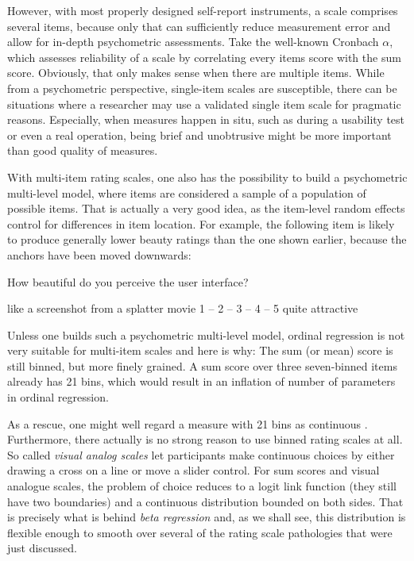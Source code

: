 \documentclass[]{svmono}
\begin{document}
However, with most properly designed self-report instruments, a scale
comprises several items, because only that can sufficiently reduce
measurement error and allow for in-depth psychometric assessments. Take
the well-known Cronbach \(\alpha\), which assesses reliability of a
scale by correlating every items score with the sum score. Obviously,
that only makes sense when there are multiple items. While from a
psychometric perspective, single-item scales are susceptible, there can
be situations where a researcher may use a validated single item scale
for pragmatic reasons. Especially, when measures happen in situ, such as
during a usability test or even a real operation, being brief and
unobtrusive might be more important than good quality of measures.

With multi-item rating scales, one also has the possibility to build a
psychometric multi-level model, where items are considered a sample of a
population of possible items. That is actually a very good idea, as the
item-level random effects control for differences in item location. For
example, the following item is likely to produce generally lower beauty
ratings than the one shown earlier, because the anchors have been moved
downwards:

How beautiful do you perceive the user interface?

like a screenshot from a splatter movie 1 -- 2 -- 3 -- 4 -- 5 quite
attractive

Unless one builds such a psychometric multi-level model, ordinal
regression is not very suitable for multi-item scales and here is why:
The sum (or mean) score is still binned, but more finely grained. A sum
score over three seven-binned items already has 21 bins, which would
result in an inflation of number of parameters in ordinal regression.

As a rescue, one might well regard a measure with 21 bins as continuous
. Furthermore, there actually is no strong reason to use binned rating
scales at all. So called \emph{visual analog scales} let participants
make continuous choices by either drawing a cross on a line or move a
slider control. For sum scores and visual analogue scales, the problem
of choice reduces to a logit link function (they still have two
boundaries) and a continuous distribution bounded on both sides. That is
precisely what is behind \emph{beta regression} and, as we shall see,
this distribution is flexible enough to smooth over several of the
rating scale pathologies that were just discussed.
\end{document}

